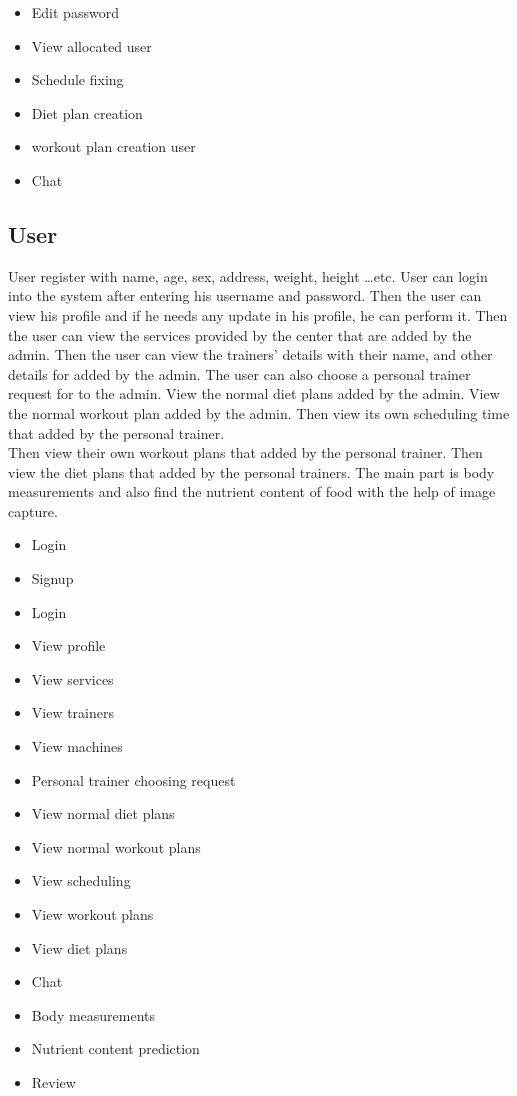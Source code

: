 \documentclass[a4paper,12pt,toc=flat]{report}
\begin{document}
{\begin{itemize}
		\item	Edit password
		\item	View allocated user
		\item	Schedule fixing 
		
		\item	Diet plan creation 
		\item	workout plan creation  user
			\item	Chat
	\end{itemize}
	
	\subsection{User}
	User register with name, age, sex, address, weight, height …etc.  User can login into the system after entering his username and password. Then the user can view his profile and if he needs any update in his profile, he can perform it. Then the user can view the services provided by the center that are added by the admin. Then the user can view the trainers’ details with their name, and other details for added by the admin. The user can also choose a personal trainer request for to the admin. View the normal diet plans added by the admin. View the normal workout plan added by the admin. Then view its own scheduling time that added by the personal trainer.
	\pagebreak
	\\
	Then view their own workout plans that added by the personal trainer. Then view the diet plans that added by the personal trainers. The main part is body measurements and also find the nutrient content of food with the help of image capture.
	\begin{itemize}
		\item  Login
		\item	Signup
		\item	Login
		\item	View profile
		\item	View services
		\item	View trainers
			\item	View machines
		\item	Personal trainer choosing request
		\item	View normal diet plans
		\item	View normal workout plans
		\item	View scheduling 
		\item	View workout plans 
		\item	View diet plans
		\item	Chat
		\item	Body measurements
			\item	Nutrient content prediction
		\item  Review
	\end{itemize}
	
}
\end{document}
